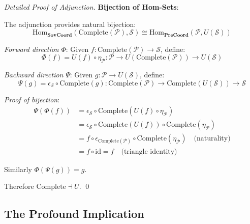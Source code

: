 \documentclass[11pt,a4paper]{article}
\theoremstyle{definition}
\theoremstyle{remark}
\newcommand{\SovCoord}{\mathbf{SovCoord}}
\newcommand{\Hom}{\text{Hom}}
\begin{document}
\begin{proof}[Detailed Proof of Adjunction]
\textbf{Bijection of Hom-Sets}:

The adjunction provides natural bijection:
\[ \Hom_{\SovCoord}(\text{Complete}(\mathcal{P}), \mathcal{S}) \cong \Hom_{\mathbf{PreCoord}}(\mathcal{P}, U(\mathcal{S})) \]

\textit{Forward direction} $\Phi$: Given $f: \text{Complete}(\mathcal{P}) \to \mathcal{S}$, define:
\[ \Phi(f) = U(f) \circ \eta_{\mathcal{P}}: \mathcal{P} \to U(\text{Complete}(\mathcal{P})) \to U(\mathcal{S}) \]

\textit{Backward direction} $\Psi$: Given $g: \mathcal{P} \to U(\mathcal{S})$, define:
\[ \Psi(g) = \epsilon_{\mathcal{S}} \circ \text{Complete}(g): \text{Complete}(\mathcal{P}) \to \text{Complete}(U(\mathcal{S})) \to \mathcal{S} \]

\textit{Proof of bijection}:
\begin{align*}
\Psi(\Phi(f)) &= \epsilon_{\mathcal{S}} \circ \text{Complete}(U(f) \circ \eta_{\mathcal{P}}) \\
&= \epsilon_{\mathcal{S}} \circ \text{Complete}(U(f)) \circ \text{Complete}(\eta_{\mathcal{P}}) \\
&= f \circ \epsilon_{\text{Complete}(\mathcal{P})} \circ \text{Complete}(\eta_{\mathcal{P}}) \quad \text{(naturality)} \\
&= f \circ \text{id} = f \quad \text{(triangle identity)}
\end{align*}

Similarly $\Phi(\Psi(g)) = g$.

Therefore $\text{Complete} \dashv U$. \qed
\end{proof}

\subsection{The Profound Implication}

\begin{center}
\end{center}
\end{document}
